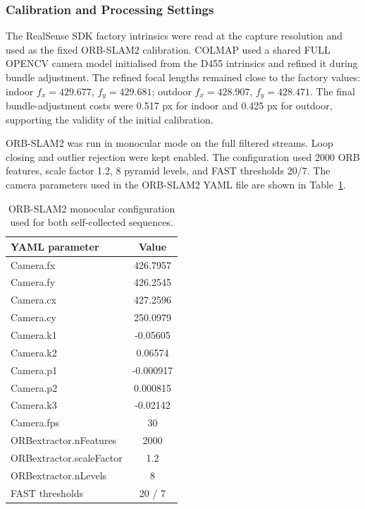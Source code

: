\documentclass[conference]{IEEEtran}
\begin{document}
\subsubsection{Calibration and Processing Settings}

The RealSense SDK factory intrinsics were read at the capture resolution and used as the fixed ORB-SLAM2 calibration. COLMAP used a shared FULL OPENCV camera model initialised from the D455 intrinsics and refined it during bundle adjustment. The refined focal lengths remained close to the factory values: indoor $f_x = 429.677$, $f_y = 429.681$; outdoor $f_x = 428.907$, $f_y = 428.471$. The final bundle-adjustment costs were 0.517 px for indoor and 0.425 px for outdoor, supporting the validity of the initial calibration.

ORB-SLAM2 was run in monocular mode on the full filtered streams. Loop closing and outlier rejection were kept enabled. The configuration used 2000 ORB features, scale factor 1.2, 8 pyramid levels, and FAST thresholds 20/7. The camera parameters used in the ORB-SLAM2 YAML file are shown in Table~\ref{tab:q2_orbslam_yaml}.

\begin{table}[!t]
\caption{ORB-SLAM2 monocular configuration used for both self-collected sequences.}
\centering
\footnotesize
\begin{tabular}{lc}
\toprule
YAML parameter & Value \\
\midrule
Camera.fx & 426.7957 \\
Camera.fy & 426.2545 \\
Camera.cx & 427.2596 \\
Camera.cy & 250.0979 \\
Camera.k1 & -0.05605 \\
Camera.k2 & 0.06574 \\
Camera.p1 & -0.000917 \\
Camera.p2 & 0.000815 \\
Camera.k3 & -0.02142 \\
Camera.fps & 30 \\
ORBextractor.nFeatures & 2000 \\
ORBextractor.scaleFactor & 1.2 \\
ORBextractor.nLevels & 8 \\
FAST thresholds & 20 / 7 \\
\bottomrule
\end{tabular}
\label{tab:q2_orbslam_yaml}
\end{table}
\end{document}
